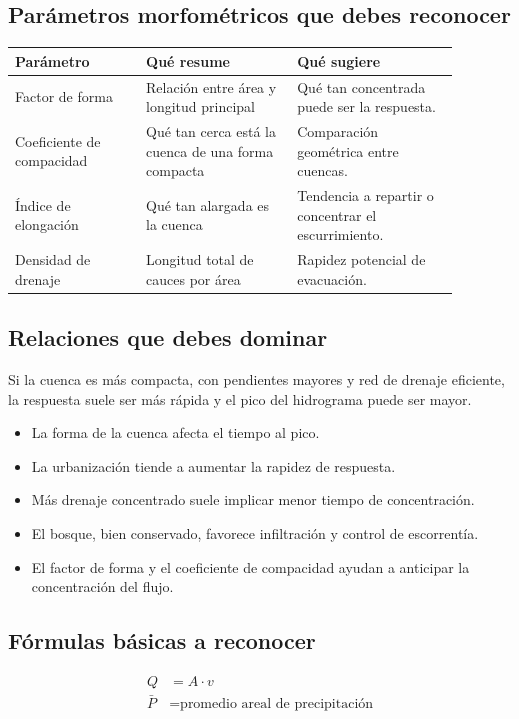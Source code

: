 \documentclass[11pt]{article}
\begin{document}
\subsection{Parámetros morfométricos que debes reconocer}
\begin{center}
\begin{tabular}{p{0.26\linewidth} p{0.30\linewidth} p{0.32\linewidth}}
\toprule
\textbf{Parámetro} & \textbf{Qué resume} & \textbf{Qué sugiere} \\
\midrule
Factor de forma & Relación entre área y longitud principal & Qué tan concentrada puede ser la respuesta. \\
Coeficiente de compacidad & Qué tan cerca está la cuenca de una forma compacta & Comparación geométrica entre cuencas. \\
Índice de elongación & Qué tan alargada es la cuenca & Tendencia a repartir o concentrar el escurrimiento. \\
Densidad de drenaje & Longitud total de cauces por área & Rapidez potencial de evacuación. \\
\bottomrule
\end{tabular}
\end{center}

\subsection{Relaciones que debes dominar}
\begin{resultbox}
Si la cuenca es más compacta, con pendientes mayores y red de drenaje eficiente, la respuesta suele ser más rápida y el pico del hidrograma puede ser mayor.
\end{resultbox}

\begin{itemize}
\item La forma de la cuenca afecta el tiempo al pico.
\item La urbanización tiende a aumentar la rapidez de respuesta.
\item Más drenaje concentrado suele implicar menor tiempo de concentración.
\item El bosque, bien conservado, favorece infiltración y control de escorrentía.
\item El factor de forma y el coeficiente de compacidad ayudan a anticipar la concentración del flujo.
\end{itemize}

\subsection{Fórmulas básicas a reconocer}
\begin{align*}
Q &= A \cdot v \\
\bar{P} &= \text{promedio areal de precipitación}
\end{align*}
\end{document}
